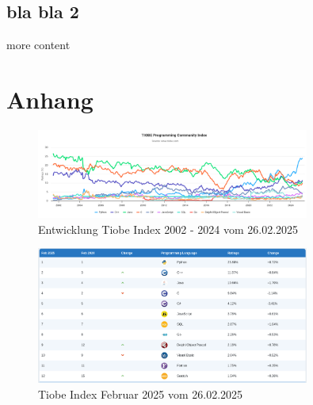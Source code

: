 \documentclass[11pt]{article}
\begin{document}
    \subsection{bla bla 2}
        more content

    \printbibliography[
        heading=bibintoc,
        title={Literaturverzeichnis}
    ]

    \appendix
    \section{Anhang}

    \begin{figure}[h]
        \centering
        \includegraphics[width=0.8\textwidth]{pictures/Screenshot 2025-02-26 at 19-53-49 TIOBE Index - TIOBE}
        \caption{Entwicklung Tiobe Index 2002 - 2024 vom 26.02.2025 }
        \label{fig:entwicklung-tiobe}
    \end{figure}

    \begin{figure}[h]
        \centering
        \includegraphics[width=0.8\textwidth]{pictures/Screenshot 2025-02-26 at 19-54-42 TIOBE Index - TIOBE}
        \caption{Tiobe Index Februar 2025 vom 26.02.2025}
        \label{fig:tiobe-2025}
    \end{figure}

    \cite{insel}
    \cite{kotlin-handbuch}
\end{document}
